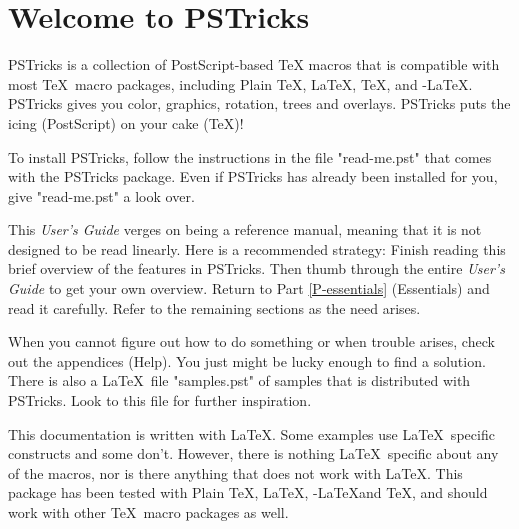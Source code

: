 
\endgroup

\setcounter{footnote}{0}
\tableofcontents
{}

\part*{Welcome to PSTricks}

PSTricks is a collection of PostScript-based \TeX{} macros that is compatible
with most \TeX\ macro packages, including Plain \TeX, \LaTeX, \AmS\TeX, and
\AmS-\LaTeX. PSTricks gives you color, graphics, rotation, trees and overlays.
  PSTricks puts the icing (PostScript) on your cake (\TeX)!

To install PSTricks, follow the instructions in the file "read-me.pst" that
comes with the PSTricks package. Even if PSTricks has already been installed
for you, give "read-me.pst" a look over.

This {\em User's Guide} verges on being a reference manual, meaning that it is
not designed to be read linearly. Here is a recommended strategy: Finish
reading this brief overview of the features in PSTricks. Then thumb through
the entire {\em User's Guide} to get your own overview. Return to Part
\ref{P-essentials} (Essentials) and read it carefully. Refer to the remaining
sections as the need arises.

When you cannot figure out how to do something or when trouble arises, check
out the appendices (Help). You just might be lucky enough to find a solution.
There is also a \LaTeX\ file "samples.pst" of samples that is distributed with
PSTricks. Look to this file for further inspiration.

This documentation is written with \LaTeX. Some examples use \LaTeX\ specific
constructs and some don't. However, there is nothing \LaTeX\ specific about
any of the macros, nor is there anything that does not work with \LaTeX. This
package has been tested with Plain \TeX, \LaTeX, \AmS-\LaTeX and \AmS\TeX, and
should work with other \TeX\ macro packages as well.

